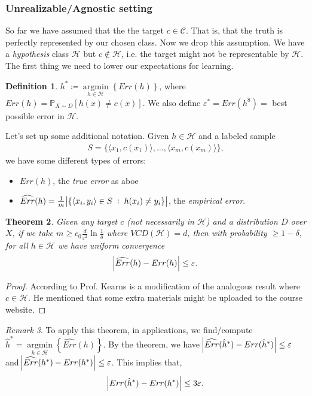 \documentclass[12pt, letterpaper]{article}
\numberwithin{equation}{section} %
\newcommand{\mb}{\mathbb}
\newcommand{\mc}{\mathcal}
\newcommand{\ve}{\varepsilon}
\newtheorem{theorem}{Theorem}[section]
\theoremstyle{definition}
\newtheorem{definition}[theorem]{Definition}
\theoremstyle{remark}
\newtheorem{remark}[theorem]{Remark}
\begin{document}
\subsubsection{Unrealizable/Agnostic setting}
So far we have assumed that the the target $c\in\mc C$. That is, that the truth is perfectly represented by our chosen class. Now we drop this assumption. We have a \emph{hypothesis} class $\mc H$ but $c\not\in\mc H$, i.e. the target might not be representable by $\mc H$. The first thing we need to lower our expectations for learning.
\begin{definition}
    $h^*\coloneqq \mathop{argmin}\limits_{h\in\mc H}\left\{Err(h)\right\}$, where $Err(h) = \mb P_{X\sim D}[h(x)\ne c(x)]$. We also define $\ve^* = Err(h^8)=$ best possible error in $\mc H.$
\end{definition}
Let's set up some additional notation. Given $h\in \mc H$ and a labeled sample 
\begin{align}
    S=\lbrace \langle x_1, c(x_1)\rangle,\ldots,\langle x_m, c(x_m)\rangle\rbrace,
\end{align}
we have some different types of errors:
\begin{itemize}
\item $Err(h)$, the \emph{true error} as aboe
\item $\widehat{Err}(h) = \frac1m \abs{\lbrace \langle x_i, y_i\rangle \in S \;:\;h(x_i)\ne y_i\rbrace}$, the \emph{empirical error}.
\end{itemize}

\begin{theorem}
    Given any target $c$ (not necessarily in $\mc H$) and a distribution $D$ over $X$, if we take $m\geq c_0 \frac d{\ve^2}\ln \frac1\delta$ where $VCD(\mc H)=d$, then with probability $\geq 1-\delta$, for all $h\in\mc H$ we have \emph{uniform} convergence
    \begin{align}
        \abs{\widehat{Err}(h)-Err(h)} \leq \ve.
    \end{align}
\end{theorem}
\begin{proof}
    According to Prof. Kearns is a modification of the analogous result where $c\in\mc H$. He mentioned that some extra materials might be uploaded to the course website.
\end{proof}
\begin{remark}
    To apply this theorem, in applications, we find/compute $\hat h^* = \mathop{argmin}\limits_{h\in\mc H}\left\{\widehat{Err}(h)\right\}$. By the theorem, we have
    $ \abs{\widehat{Err}(\hat h^*)-Err(\hat h^*)} \leq \ve$ and  $\abs{\widehat{Err}(h^*)-Err(h^*)} \leq \ve$. This implies that,
    \begin{align}
        \abs{Err(\hat h^*) - Err(h^*)} \leq 3\ve.
    \end{align}
\end{remark}
\end{document}
